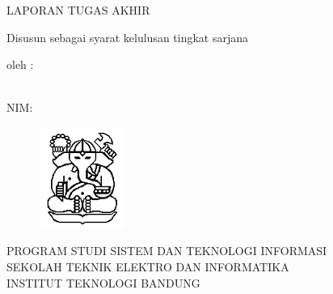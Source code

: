 \clearpage
\pagestyle{empty}

\begin{center}
\smallskip

    \Large \MakeUppercase{\bfseries \thetitle}
    \vfill

    \normalsize \MakeUppercase{Laporan Tugas Akhir}
    \vfill

    \normalsize Disusun sebagai syarat kelulusan tingkat sarjana
    \vfill

    \normalsize oleh :

    \normalsize \theauthor \\
    \normalsize NIM: \nim

    \vfill
    \begin{figure}[h]
        \centering
      	\includegraphics[width=0.25\textwidth]{resources/cover-ganesha.png}
    \end{figure}
    \vfill

    \large
    \uppercase{
        Program Studi Sistem dan Teknologi Informasi \\
        Sekolah Teknik Elektro dan Informatika \\
        Institut Teknologi Bandung \\
    }
    \yearsidang{}

\end{center}

\clearpage
